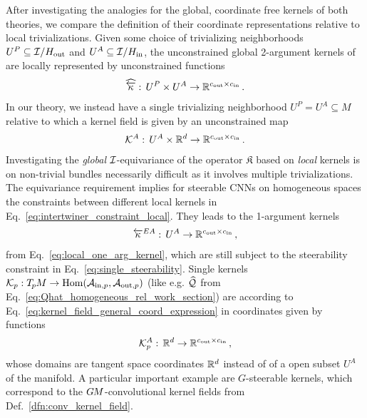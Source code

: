 After investigating the analogies for the global, coordinate free kernels of both theories, we compare the definition of their coordinate representations relative to local trivializations.
Given some choice of trivializing neighborhoods $U^P \subseteq \mathcal{I}/H_{\textup{out}}$ and $U^A \subseteq \mathcal{I}/H_{\textup{in}}$, the unconstrained global 2-argument kernels of \citet{Cohen2018-intertwiners}\cite{Cohen2019-generaltheory} are locally represented by unconstrained functions
\begin{align}
    \widehat{\overleftarrow{\kappa}}:\, U^P \times U^A \to \mathbb{R}^{{c_\textup{out}}\times{c_\textup{in}}} \,.
\end{align}
In our theory, we instead have a single trivializing neighborhood $U^P = U^A \subseteq M$ relative to which a kernel field is given by an unconstrained map
\begin{align}
    \mathcal{K}^A:\, U^A \times \mathbb{R}^d \to \mathbb{R}^{{c_\textup{out}}\times{c_\textup{in}}} \,.
\end{align}
Investigating the \emph{global} $\mathcal{I}$-equivariance of the operator $\mathfrak{K}$ based on \emph{local} kernels is on non-trivial bundles necessarily difficult as it involves multiple trivializations.
The equivariance requirement implies for steerable CNNs on homogeneous spaces the constraints between different local kernels in Eq.~\eqref{eq:intertwiner_constraint_local}.
They leads to the 1-argument kernels
\begin{align}
    \overleftarrow{\kappa}^{EA} :\, U^A \to \mathbb{R}^{{c_\textup{out}}\times{c_\textup{in}}} \,,
\end{align}
from Eq.~\eqref{eq:local_one_arg_kernel}, which are still subject to the steerability constraint in Eq.~\eqref{eq:single_steerability}.
Single kernels $\mathcal{K}_p: T_{\mkern-1.5mu p}\mkern-.5muM \to \operatorname{Hom}(\mathcal{A}_{\textup{in},p},\mathcal{A}_{\textup{out},p})$ (like e.g. $\widehat{\mathcal{Q}}$ from Eq.~\eqref{eq:Qhat_homogeneous_rel_work_section}) are according to Eq.~\eqref{eq:kernel_field_general_coord_expression} in coordinates given by functions
\begin{align}
    \mathcal{K}_p^A:\, \mathbb{R}^d \to \mathbb{R}^{{c_\textup{out}}\times{c_\textup{in}}} \,,
\end{align}
whose domains are tangent space coordinates $\mathbb{R}^d$ instead of of a open subset $U^A$ of the manifold.
A particular important example are $G$-steerable kernels, which correspond to the $G\mkern-1.4muM$-convolutional kernel fields from Def.~\ref{dfn:conv_kernel_field}.


